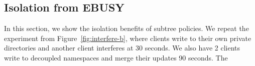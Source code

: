 %
%
%
%
%
%
%
%
%
%
%

\subsection{Isolation from EBUSY}

In this section, we show the isolation benefits of subtree policies.  We repeat
the experiment from Figure~\ref{fig:interfere-b}, where clients write to their
own private directories and another client interferes at 30 seconds.  We also
have 2 clients write to decoupled namespaces and merge their updates 90
seconds. The 

